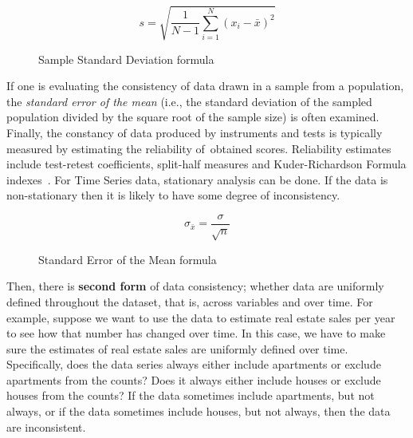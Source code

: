 \begin{figure}[htb]
    \centering
    
    \begin{equation*}
        s = \sqrt{\frac{1}{N - 1}\sum_{i=1}^{N} (x_{i} - \bar{x})^2}
    \end{equation*}

    \caption{Sample Standard Deviation formula}
    \label{form:sample-standard-dev}
\end{figure}
\FloatBarrier

If one is evaluating the consistency of data drawn in a sample from a population, the \textit{standard error of the mean} (i.e., the standard deviation of the sampled population divided by the square root of the sample size) is often examined.
Finally, the constancy of data produced by instruments and tests is typically measured by estimating the reliability of~obtained scores.
Reliability estimates include test-retest coefficients, split-half measures and Kuder-Richardson Formula  indexes~\cite{quora:consistency2017}.
For Time Series data, stationary analysis can be done.
If the data is non-stationary then it is likely to have some degree of inconsistency.

\begin{figure}[htb]
    \centering
    
    \begin{equation*}
        \sigma_{\bar{x}} = \frac{\sigma}{\sqrt{n}}
    \end{equation*}

    \caption{Standard Error of the Mean formula}
    \label{form:sem}
\end{figure}
\FloatBarrier

Then, there is \textbf{second form} of data consistency; whether data are uniformly defined throughout the dataset, that is, across variables and over time.
For example, suppose we want to use the data to estimate real estate sales per year to see how that number has changed over time.
In this case, we have to make sure the estimates of real estate sales are uniformly defined over time.
Specifically, does the data series always either include apartments or exclude apartments from the counts?
Does it always either include houses or exclude houses from the counts?
If the data sometimes include apartments, but not always, or if the data sometimes include houses, but not always, then the data are inconsistent.

